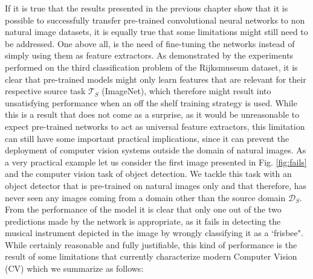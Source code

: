 If it is true that the results presented in the previous chapter show that it is possible to successfully transfer pre-trained convolutional neural networks to non natural image datasets, it is equally true that some limitations might still need to be addressed. One above all, is the need of fine-tuning the networks instead of simply using them as feature extractors. As demonstrated by the experiments performed on the third classification problem of the Rijksmuseum dataset, it is clear that pre-trained models might only learn features that are relevant for their respective source task $\mathcal{T}_S$ (ImageNet), which therefore might result into unsatisfying performance when an off the shelf training strategy is used. While this is a result that does not come as a surprise, as it would be unreasonable to expect pre-trained networks to act as universal feature extractors, this limitation can still have some important practical implications, since it can prevent the deployment of computer vision systems outside the domain of natural images. As a very practical example let us consider the first image presented in Fig. \ref{fig:fails} and the computer vision task of object detection. We tackle this task with an object detector that is pre-trained on natural images only and that therefore, has never seen any images coming from a domain other than the source domain $\mathcal{D}_S$. From the performance of the model it is clear that only one out of the two predictions made by the network is appropriate, as it fails in detecting the musical instrument depicted in the image by wrongly classifying it as a `frisbee". While certainly reasonable and fully justifiable, this kind of performance is the result of some limitations that currently characterize modern Computer Vision (CV) which we summarize as follows:

